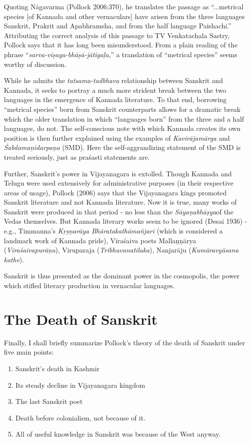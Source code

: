 Quoting Nāgavarma (Pollock 2006:370), he translates the passage as “...metrical species [of Kannada and other vernaculars] have arisen from the three languages Sanskrit, Prakrit and Apabhramsha, and from the half language Paishachi.” Attributing the correct analysis of this passage to TV Venkatachala Sastry, Pollock says that it has long been misunderstood. From a plain reading of the phrase “{\sl sarva-viṣaya-bhāṣā-jātigaḷu},” a translation of “metrical species” seems worthy of discussion. 

While he admits the {\sl tatsama-tadbhava} relationship between Sanskrit and Kannada, it seeks to portray a much more strident break between the two languages in the emergence of Kannada literature. To that end, borrowing “metrical species” born from Sanskrit counterparts allows for a dramatic break which the older translation in which “languages born” from the three and a half languages, do not. The self-conscious note with which Kannada creates its own position is then further explained using the examples of {\sl Kavirājamārga} and {\sl Śabdamaṇidarpaṇa} (SMD). Here the self-aggrandizing statement of the SMD is treated seriously, just as praśasti statements are. 

Further, Sanskrit’s power in Vijayanagara is extolled. Though Kannada and Telugu were used extensively for administrative purposes (in their respective areas of usage), Pollock (2006) says that the Vijayanagara kings promoted Sanskrit literature and not Kannada literature. Now it is true, many works of Sanskrit were produced in that period - no less than the {\sl Sāyaṇabhāṣya}of the Vedas themselves. But Kannada literary works seem to be ignored (Desai 1936) - e.g., Timmanna’s {\sl Kṛṣṇarāya Bhāratakathāmañjarī} (which is considered a landmark work of Kannada pride), Vīraśaiva poets Mallaṇṇārya ({\sl Vīraśaivapurāṇa}), Viruparaja ({\sl Tribhuvanatilaka}), Nanjarāju ({\sl Kumāravyāsana kathe}).

Sanskrit is thus presented as the dominant power in the cosmopolis, the power which stifled literary production in vernacular languages.
\vskip -10pt

\section{The Death of Sanskrit}
\vskip -3pt

Finally, I shall briefly summarize Pollock’s theory of the death of Sanskrit under five main points:

\begin{enumerate}
\item Sanskrit’s death in Kashmir
\item Its steady decline in Vijayanagara kingdom
\item The last Sanskrit poet
\item Death before colonialism, not because of it. 
\item All of useful knowledge in Sanskrit was because of the West anyway.
\end{enumerate}

